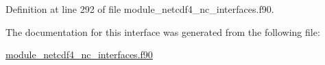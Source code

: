 Definition at line 292 of file module\+\_\+netcdf4\+\_\+nc\+\_\+interfaces.\+f90.



The documentation for this interface was generated from the following file\+:\begin{DoxyCompactItemize}
\item 
\hyperlink{module__netcdf4__nc__interfaces_8f90}{module\+\_\+netcdf4\+\_\+nc\+\_\+interfaces.\+f90}\end{DoxyCompactItemize}
